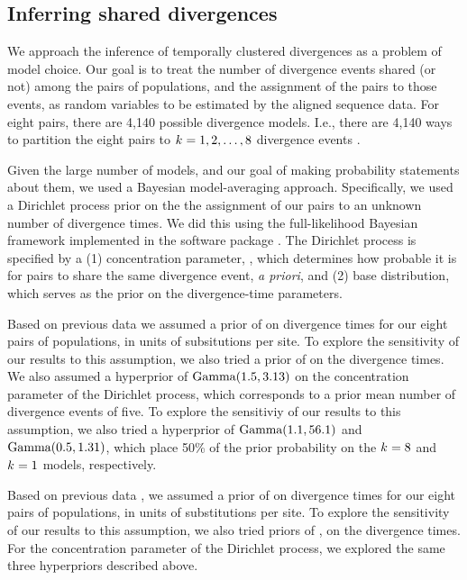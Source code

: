 \subsection{Inferring shared divergences}
We approach the inference of temporally clustered divergences as a problem of
model choice.
Our goal is to treat the number of divergence events shared (or not) among the
pairs of populations, and the assignment of the pairs to those events, as
random variables to be estimated by the aligned sequence data.
For eight pairs, there are 4,140 possible divergence models.
I.e., there are 4,140 ways to partition the eight pairs to $k_{} = 1, 2,
\ldots, 8$ divergence events \citep{Bell1934,Oaks2014dpp,Oaks2018ecoevolity}.

Given the large number of models, and our goal of making probability statements
about them, we used a Bayesian model-averaging approach.
Specifically, we used a Dirichlet process prior on the the assignment of our
pairs to an unknown number of divergence times.
We did this using the full-likelihood Bayesian framework implemented in the
software package \ecoevolity \citep{Oaks2018ecoevolity}.
The Dirichlet process is specified by a
(1) concentration parameter, \concentration, which determines how probable it
is for pairs to share the same divergence event, \emph{a priori}, and
(2) base distribution, which serves as the prior on the divergence-time
parameters.

Based on previous data \citep{Welton2010, Welton2010zootaxa, Siler2010} we
assumed a prior of  on divergence times for our eight pairs
of  populations, in units of subsitutions per site.
To explore the sensitivity of our results to this assumption, we also
tried a prior of  on the divergence times.
We also assumed a hyperprior of $\textrm{Gamma}(1.5, 3.13)$ on the concentration
parameter of the Dirichlet process, which corresponds to a prior mean number of
divergence events of five.
To explore the sensitiviy of our results to this assumption, we also
tried a hyperprior of
$\textrm{Gamma}(1.1, 56.1)$
and
$\textrm{Gamma}(0.5, 1.31)$,
which place 50\% of the prior probability on the
$k_{} = 8$
and
$k_{} = 1$
models, respectively.

Based on previous data \citep{Siler2012, Siler2014kikuchii}, we assumed a prior
of  on divergence times for our eight pairs of 
populations, in units of substitutions per site.
To explore the sensitivity of our results to this assumption, we also tried
priors of ,  on the 
divergence times.
For the concentration parameter of the Dirichlet process, we explored the same
three hyperpriors described above.

